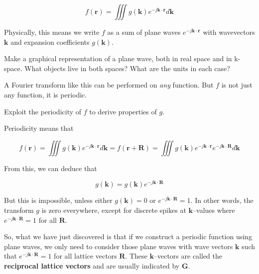 \begin{equation}
f({\mathbf r}) = \iiint g({\mathbf k}) e ^ {-j {\mathbf k} \cdot {\mathbf r}} d{\mathbf k}
\end{equation} 

Physically, this means we write $f$ as a sum of plane waves $e ^ {-j {\mathbf k} \cdot {\mathbf r}}$ with wavevectors ${\mathbf k}$ and expansion coefficients $g({\mathbf k})$.


\begin{exer}
Make a graphical representation of a plane wave, both in real space and in k-space. What objects live in both spaces? What are the units in each case?
\end{exer}

A Fourier transform like this can be performed on \emph{any} function. But $f$ is not just any function, it is periodic.

\begin{cue}
Exploit the periodicity of $f$ to derive properties of $g$. 
\end{cue}

Periodicity means that

\begin{equation}
f({\mathbf r}) = \iiint g({\mathbf k}) e ^ {-j {\mathbf k} \cdot {\mathbf r}} d{\mathbf k} = f({\mathbf r} + {\mathbf R}) = \iiint g({\mathbf k}) e ^ {-j {\mathbf k} \cdot {\mathbf r}} e ^ {-j {\mathbf k} \cdot {\mathbf R}} d{\mathbf k}
\end{equation} 

From this, we can deduce that

\begin{equation}
g({\mathbf k}) = g({\mathbf k}) e ^ {-j {\mathbf k} \cdot {\mathbf R}}
\end{equation} 

But this is impossible, unless either $g({\mathbf k}) = 0$ or $e ^ {-j {\mathbf k} \cdot {\mathbf R}} = 1$. In other words, the transform $g$ is zero everywhere, except for discrete spikes at ${\mathbf k}$--values where $e ^ {-j {\mathbf k} \cdot {\mathbf R}} = 1$ for all ${\mathbf R}$.

So, what we have just discovered is that if we construct a periodic function using plane waves, we only need to consider those plane waves with wave vectors ${\mathbf k}$ such that $e ^ {-j {\mathbf k} \cdot {\mathbf R}} = 1$ for all lattice vectors ${\mathbf R}$. These ${\mathbf k}$--vectors are called the \textbf{reciprocal lattice vectors} and are usually indicated by ${\mathbf G}$.

